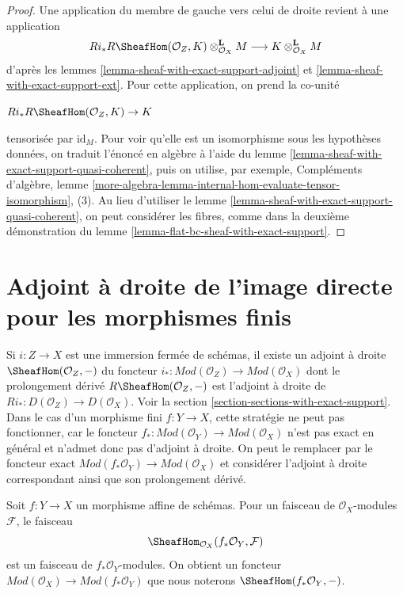 \begin{proof}
Une application du membre de gauche vers celui de droite revient à une application
$$
Ri_*R\SheafHom(\mathcal{O}_Z, K) \otimes_{\mathcal{O}_X}^\mathbf{L} M
\longrightarrow
K \otimes_{\mathcal{O}_X}^\mathbf{L} M
$$
d'après les lemmes \ref{lemma-sheaf-with-exact-support-adjoint} et \ref{lemma-sheaf-with-exact-support-ext}. Pour cette application, on prend la co-unité
\par\noindent\hfil
$Ri_*R\SheafHom(\mathcal{O}_Z, K) \to K$
\hfil\par\noindent
tensorisée par $\text{id}_M$. Pour voir qu'elle est un isomorphisme sous les hypothèses données, on traduit l'énoncé en algèbre à l'aide du lemme \ref{lemma-sheaf-with-exact-support-quasi-coherent}, puis on utilise, par exemple, Compléments d'algèbre, lemme \ref{more-algebra-lemma-internal-hom-evaluate-tensor-isomorphism}, (3). Au lieu d'utiliser le lemme \ref{lemma-sheaf-with-exact-support-quasi-coherent}, on peut considérer les fibres, comme dans la deuxième démonstration du lemme \ref{lemma-flat-bc-sheaf-with-exact-support}.
\end{proof}



\section{Adjoint à droite de l'image directe pour les morphismes finis}
\label{section-duality-finite}

\noindent
Si $i : Z \to X$ est une immersion fermée de schémas, il existe un adjoint à droite $\SheafHom(\mathcal{O}_Z, -)$ du foncteur $i_* : \textit{Mod}(\mathcal{O}_Z) \to \textit{Mod}(\mathcal{O}_X)$ dont le prolongement dérivé $R\SheafHom(\mathcal{O}_Z, -)$ est l'adjoint à droite de $Ri_* : D(\mathcal{O}_Z) \to D(\mathcal{O}_X)$. Voir la section \ref{section-sections-with-exact-support}. Dans le cas d'un morphisme fini $f : Y \to X$, cette stratégie ne peut pas fonctionner, car le foncteur $f_* : \textit{Mod}(\mathcal{O}_Y) \to \textit{Mod}(\mathcal{O}_X)$ n'est pas exact en général et n'admet donc pas d'adjoint à droite. On peut le remplacer par le foncteur exact
$\textit{Mod}(f_*\mathcal{O}_Y) \to \textit{Mod}(\mathcal{O}_X)$
et considérer l'adjoint à droite correspondant ainsi que son prolongement dérivé.

\medskip\noindent
Soit $f : Y \to X$ un morphisme affine de schémas. Pour un faisceau de $\mathcal{O}_X$-modules $\mathcal{F}$, le faisceau
$$
\SheafHom_{\mathcal{O}_X}(f_*\mathcal{O}_Y, \mathcal{F})
$$
est un faisceau de $f_*\mathcal{O}_Y$-modules. On obtient un foncteur
$\textit{Mod}(\mathcal{O}_X) \to \textit{Mod}(f_*\mathcal{O}_Y)$
que nous noterons $\SheafHom(f_*\mathcal{O}_Y, -)$.

